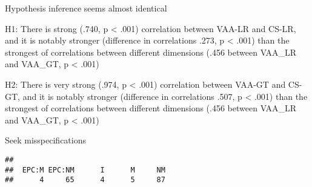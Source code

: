\documentclass[
]{article}
\newenvironment{Shaded}{\begin{snugshade}}{\end{snugshade}}
\newcommand{\CommentTok}[1]{\textcolor[rgb]{0.56,0.35,0.01}{\textit{#1}}}
\newcommand{\DataTypeTok}[1]{\textcolor[rgb]{0.13,0.29,0.53}{#1}}
\newcommand{\DecValTok}[1]{\textcolor[rgb]{0.00,0.00,0.81}{#1}}
\newcommand{\KeywordTok}[1]{\textcolor[rgb]{0.13,0.29,0.53}{\textbf{#1}}}
\newcommand{\NormalTok}[1]{#1}
\newcommand{\OperatorTok}[1]{\textcolor[rgb]{0.81,0.36,0.00}{\textbf{#1}}}
\newcommand{\StringTok}[1]{\textcolor[rgb]{0.31,0.60,0.02}{#1}}
\begin{document}
Hypothesis inference seems almost identical

H1: There is strong (.740, p \textless{} .001) correlation between
VAA-LR and CS-LR, and it is notably stronger (difference in correlations
.273, p \textless{} .001) than the strongest of correlations between
different dimensions (.456 between VAA\_LR and VAA\_GT, p \textless{}
.001)

H2: There is very strong (.974, p \textless{} .001) correlation between
VAA-GT and CS-GT, and it is notably stronger (difference in correlations
.507, p \textless{} .001) than the strongest of correlations between
different dimensions (.456 between VAA\_LR and VAA\_GT, p \textless{}
.001)

Seek misspecifications

\begin{Shaded}
\end{Shaded}

\begin{verbatim}
## 
##  EPC:M EPC:NM      I      M     NM 
##      4     65      4      5     87
\end{verbatim}
\end{document}
